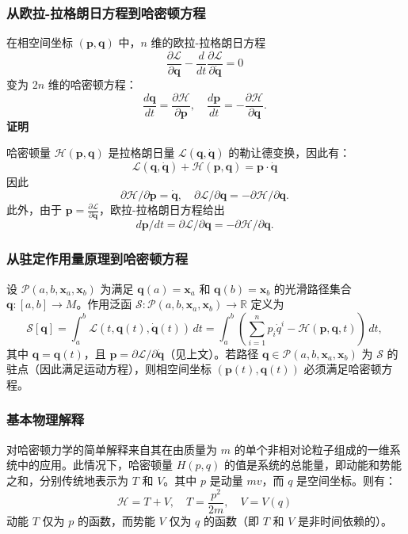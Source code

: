 \subsubsection{从欧拉-拉格朗日方程到哈密顿方程 } 
在相空间坐标 \( (\boldsymbol{p}, \boldsymbol{q}) \) 中，\( n \) 维的欧拉-拉格朗日方程
\[
\frac{\partial \mathcal{L}}{\partial \boldsymbol{q}} - \frac{d}{dt} \frac{\partial \mathcal{L}}{\partial \boldsymbol{\dot{q}}} = 0~
\]
变为 \( 2n \) 维的哈密顿方程：
\[
\frac{d \boldsymbol{q}}{dt} = \frac{\partial \mathcal{H}}{\partial \boldsymbol{p}}, \quad \frac{d \boldsymbol{p}}{dt} = -\frac{\partial \mathcal{H}}{\partial \boldsymbol{q}}.~
\]
\textbf{证明}  

哈密顿量 \( \mathcal{H}(\boldsymbol{p}, \boldsymbol{q}) \) 是拉格朗日量 \( \mathcal{L}(\boldsymbol{q}, \boldsymbol{\dot{q}}) \) 的勒让德变换，因此有：
\[
\mathcal{L}(\boldsymbol{q}, \boldsymbol{\dot{q}}) + \mathcal{H}(\boldsymbol{p}, \boldsymbol{q}) = \boldsymbol{p} \cdot \boldsymbol{\dot{q}}~
\]
因此
\[
\partial \mathcal{H}/\partial \boldsymbol{p} = \boldsymbol{\dot{q}}, \quad \partial \mathcal{L}/\partial \boldsymbol{q} = -\partial \mathcal{H}/\partial \boldsymbol{q}.~
\]
此外，由于 \( \boldsymbol{p} = \frac{\partial \mathcal{L}}{\partial \boldsymbol{\dot{q}}} \)，欧拉-拉格朗日方程给出
\[
d \boldsymbol{p}/dt = \partial \mathcal{L}/\partial \boldsymbol{q} = -\partial \mathcal{H}/\partial \boldsymbol{q}.~
\]
\subsubsection{从驻定作用量原理到哈密顿方程 } 
设 \( \mathcal{P}(a, b, \boldsymbol{x}_a, \boldsymbol{x}_b) \) 为满足 \( \boldsymbol{q}(a) = \boldsymbol{x}_a \) 和 \( \boldsymbol{q}(b) = \boldsymbol{x}_b \) 的光滑路径集合 \( \boldsymbol{q}: [a, b] \to M \)。作用泛函 \( \mathcal{S}: \mathcal{P}(a, b, \boldsymbol{x}_a, \boldsymbol{x}_b) \to \mathbb{R} \) 定义为
\[
\mathcal{S}[\boldsymbol{q}] = \int_a^b \mathcal{L}(t, \boldsymbol{q}(t), \dot{\boldsymbol{q}}(t)) \, dt = \int_a^b \left(\sum_{i=1}^n p_i \dot{q}^i - \mathcal{H}(\boldsymbol{p}, \boldsymbol{q}, t)\right) \, dt,~
\]
其中 \( \boldsymbol{q} = \boldsymbol{q}(t) \)，且 \( \boldsymbol{p} = \partial \mathcal{L} / \partial \boldsymbol{\dot{q}} \)（见上文）。若路径 \( \boldsymbol{q} \in \mathcal{P}(a, b, \boldsymbol{x}_a, \boldsymbol{x}_b) \) 为 \( \mathcal{S} \) 的驻点（因此满足运动方程），则相空间坐标 \( (\boldsymbol{p}(t), \boldsymbol{q}(t)) \) 必须满足哈密顿方程。
\subsubsection{基本物理解释}  
对哈密顿力学的简单解释来自其在由质量为 \( m \) 的单个非相对论粒子组成的一维系统中的应用。此情况下，哈密顿量 \( H(p, q) \) 的值是系统的总能量，即动能和势能之和，分别传统地表示为 \( T \) 和 \( V \)。其中 \( p \) 是动量 \( mv \)，而 \( q \) 是空间坐标。则有：
\[
\mathcal{H} = T + V, \quad T = \frac{p^2}{2m}, \quad V = V(q)~
\]
动能 \( T \) 仅为 \( p \) 的函数，而势能 \( V \) 仅为 \( q \) 的函数（即 \( T \) 和 \( V \) 是非时间依赖的）。

